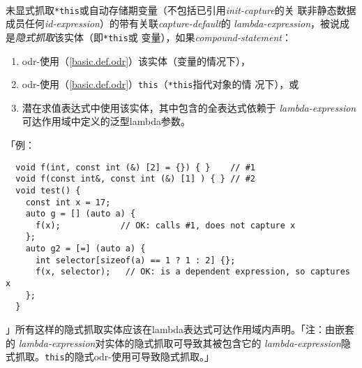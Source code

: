 \paragraph{}
未显式抓取\texttt{*this}或自动存储期变量（不包括已引用\textit{init-capture}的关
联非静态数据成员任何\textit{id-expression}）的带有关联\textit{capture-default}的
\textit{lambda-expression}，被说成是\textit{隐式抓取}该实体（即\texttt{*this}或
变量），如果\textit{compound-statement}：
\begin{enumerate}
  \item{odr-使用（\ref{basic.def.odr}）该实体（变量的情况下），}
  \item{odr-使用（\ref{basic.def.odr}）\texttt{this}（\texttt{*this}指代对象的情
    况下），或}
  \item{潜在求值表达式中使用该实体，其中包含的全表达式依赖于
    \textit{lambda-expression}可达作用域中定义的泛型lambda参数。}
\end{enumerate}
「例：
\begin{lstlisting}
  void f(int, const int (&) [2] = {}) { }    // #1
  void f(const int&, const int (&) [1] ) { } // #2
  void test() {
    const int x = 17;
    auto g = [] (auto a) {
      f(x);            // OK: calls #1, does not capture x
    };
    auto g2 = [=] (auto a) {
      int selector[sizeof(a) == 1 ? 1 : 2] {};
      f(x, selector);   // OK: is a dependent expression, so captures x
    };
  }
\end{lstlisting}
」所有这样的隐式抓取实体应该在lambda表达式可达作用域内声明。「注：由嵌套的
\textit{lambda-expression}对实体的隐式抓取可导致其被包含它的
\textit{lambda-expression}隐式抓取。\texttt{this}的隐式odr-使用可导致隐式抓取。」

